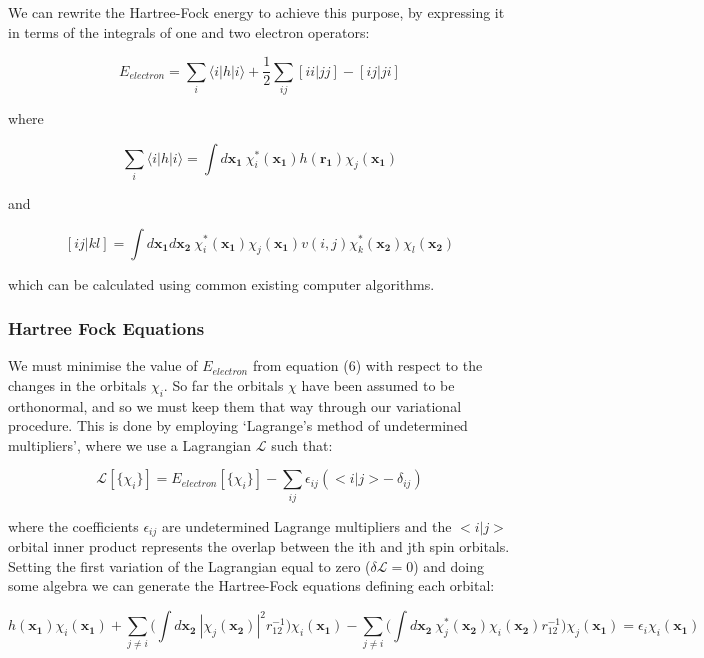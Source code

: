 \documentclass[10pt]{article}
\begin{document}
We can rewrite the Hartree-Fock energy to achieve this purpose, by expressing it in terms of the integrals of one and two electron operators:

\begin{equation}
	E_{electron} = \sum_{i}\langle i|h|i\rangle + \frac{1}{2}\sum_{ij}[ii|jj]-[ij|ji]
\end{equation}

where

$$\sum_{i}\langle i|h|i\rangle = \int d\mathbf{x_1} \ \chi^*_i(\mathbf{x_1})h(\mathbf{r_1})\chi_j(\mathbf{x_1})$$

and

$$[ij|kl] = \int d\mathbf{x_1} d\mathbf{x_2} \ \chi^*_i(\mathbf{x_1})\chi_j(\mathbf{x_1})v(i,j)\chi^*_k(\mathbf{x_2})\chi_l(\mathbf{x_2})$$

which can be calculated using common existing computer algorithms.

\subsubsection{Hartree Fock Equations}
We must minimise the value of $E_{electron}$ from equation (6) with respect to the changes in the orbitals $\chi_i$. So far the orbitals $\chi$ have been assumed to be orthonormal, and so we must keep them that way through our variational procedure. This is done by employing `Lagrange's method of undetermined multipliers', where we use a Lagrangian $\mathcal{L}$ such
that:

\begin{equation*}
	\mathcal{L}[\{\chi_i\}] = E_{electron}[\{\chi_i\}]-\sum_{ij}\epsilon_{ij}(<i|j>- \ \delta_{ij})
\end{equation*}

where the coefficients $\epsilon_{ij}$ are undetermined Lagrange multipliers and the $<i|j>$ orbital inner product represents the overlap between the ith and jth spin orbitals. Setting the first variation of the Lagrangian equal to zero ($\delta\mathcal{L} = 0$) and doing some algebra we can generate the Hartree-Fock equations defining each orbital:

\begin{equation}
	h(\mathbf{x_1})\chi_i(\mathbf{x_1})+\sum_{j \not= i}\biggr(\int d\mathbf{x_2} \ |\chi_j(\mathbf{x_2})|^2r_{12}^{-1}\biggr)\chi_i(\mathbf{x_1})-\sum_{j \not= i}\biggr(\int d\mathbf{x_2} \ \chi_j^*(\mathbf{x_2})\chi_i(\mathbf{x_2})r_{12}^{-1}\biggr)\chi_j(\mathbf{x_1}) = \epsilon_i\chi_i(\mathbf{x_1})
\end{equation}
\end{document}
